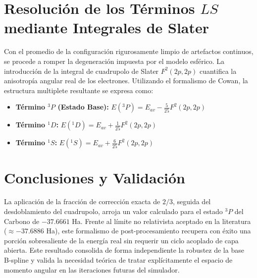 \documentclass[11pt, a4paper]{article}
\begin{document}
\section{Resolución de los Términos $LS$ mediante Integrales de Slater}
Con el promedio de la configuración rigurosamente limpio de artefactos continuos, se procede a romper la degeneración impuesta por el modelo esférico. La introducción de la integral de cuadrupolo de Slater $F^2(2p, 2p)$ cuantifica la anisotropía angular real de los electrones. Utilizando el formalismo de Cowan, la estructura multiplete resultante se expresa como:

\begin{itemize}
    \item \textbf{Término $^3P$ (Estado Base):} $E(^3P) = E_{av} - \frac{5}{25} F^2(2p, 2p)$
    \item \textbf{Término $^1D$:} $E(^1D) = E_{av} + \frac{1}{25} F^2(2p, 2p)$
    \item \textbf{Término $^1S$:} $E(^1S) = E_{av} + \frac{6}{25} F^2(2p, 2p)$
\end{itemize}

\section{Conclusiones y Validación}
La aplicación de la fracción de corrección exacta de $2/3$, seguida del desdoblamiento del cuadrupolo, arroja un valor calculado para el estado $^3P$ del Carbono de $-37.6661$ Ha. Frente al límite no relativista aceptado en la literatura ($\approx -37.6886$ Ha), este formalismo de post-procesamiento recupera con éxito una porción sobresaliente de la energía real sin requerir un ciclo acoplado de capa abierta. Este resultado consolida de forma independiente la robustez de la base B-spline y valida la necesidad teórica de tratar explícitamente el espacio de momento angular en las iteraciones futuras del simulador.
\end{document}
